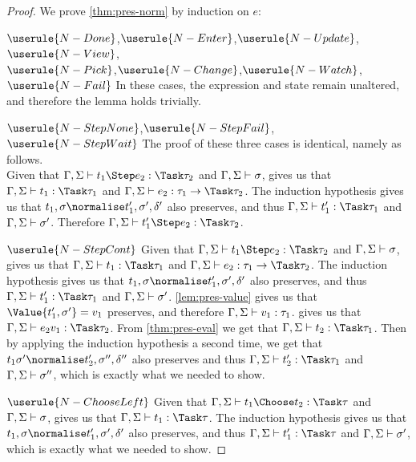 \begin{proof}
We prove \cref{thm:pres-norm} by induction on $e$:

\case
  {$\userule{N-Done}$,$\userule{N-Enter}$,$\userule{N-Update}$,$\userule{N-View}$,\\$\userule{N-Pick}$,$\userule{N-Change}$,$\userule{N-Watch}$,$\userule{N-Fail}$}
  {In these cases, the expression and state remain unaltered, and therefore the lemma holds trivially.}

\case
  {$\userule{N-StepNone}$,$\userule{N-StepFail}$,\\$\userule{N-StepWait}$}
  {The proof of these three cases is identical, namely as follows.\\
  Given that $\Gamma,\Sigma\infers t_1\Step e_2:\Task\tau_2$ and $\Gamma,\Sigma\vdash \sigma$,  gives us that $\Gamma,\Sigma\infers t_1:\Task\tau_1$ and $\Gamma,\Sigma\infers e_2:\tau_1\to\Task \tau_2$.
  The induction hypothesis gives us that $t_1,\sigma\normalise t_1',\sigma',\delta'$ also preserves, and thus $\Gamma,\Sigma\infers t_1':\Task\tau_1$ and $\Gamma,\Sigma\vdash\sigma'$.
  Therefore $\Gamma,\Sigma\infers t_1'\Step e_2:\Task\tau_2$.}

\case
  {$\userule{N-StepCont}$}
  {Given that $\Gamma,\Sigma\infers t_1\Step e_2:\Task\tau_2$ and $\Gamma,\Sigma\vdash \sigma$,  gives us that $\Gamma,\Sigma\infers t_1:\Task\tau_1$ and $\Gamma,\Sigma\infers e_2:\tau_1\to\Task \tau_2$.
  The induction hypothesis gives us that $t_1,\sigma\normalise t_1',\sigma',\delta'$ also preserves, and thus $\Gamma,\Sigma\infers t_1':\Task\tau_1$ and $\Gamma,\Sigma\vdash\sigma'$.
  \cref{lem:pres-value} gives us that $\Value{t_1',\sigma'}=v_1$ preserves, and therefore $\Gamma,\Sigma\vdash v_1:\tau_1$.
   gives us that $\Gamma,\Sigma\infers e_2 v_1 : \Task\tau_2$.
  From \cref{thm:pres-eval} we get that $\Gamma,\Sigma\infers t_2:\Task\tau_1$.
  Then by applying the induction hypothesis a second time, we get that $t_1\sigma'\normalise t_2',\sigma'',\delta''$ also preserves and thus $\Gamma,\Sigma\infers t_2':\Task\tau_1$ and $\Gamma,\Sigma\vdash \sigma''$, which is exactly what we needed to show.}

\case
  {$\userule{N-ChooseLeft}$}
  {Given that $\Gamma,\Sigma\infers t_1 \Choose t_2 : \Task \tau$ and $\Gamma,\Sigma\vdash\sigma$,  gives us that $\Gamma,\Sigma\infers t_1:\Task\tau$.
  The induction hypothesis gives us that $t_1,\sigma\normalise t_1',\sigma',\delta'$ also preserves,
  and thus $\Gamma,\Sigma\infers t_1':\Task\tau$ and $\Gamma,\Sigma\vdash \sigma'$, which is exactly what we needed to show.}


\end{proof}
